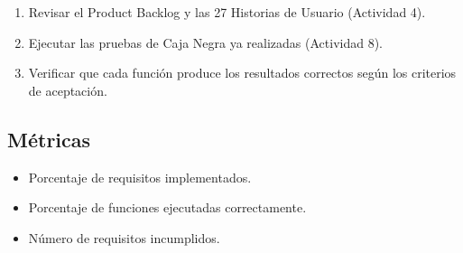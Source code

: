 \documentclass[stu]{apa7}
\begin{document}
\begin{enumerate}
    \item Revisar el Product Backlog y las 27 Historias de Usuario (Actividad 4).
    \item Ejecutar las pruebas de Caja Negra ya realizadas (Actividad 8).
    \item Verificar que cada función produce los resultados correctos según los criterios de aceptación.
\end{enumerate}

\subsection{Métricas}

\begin{itemize}
    \item Porcentaje de requisitos implementados.
    \item Porcentaje de funciones ejecutadas correctamente.
    \item Número de requisitos incumplidos.
\end{itemize}
\end{document}
